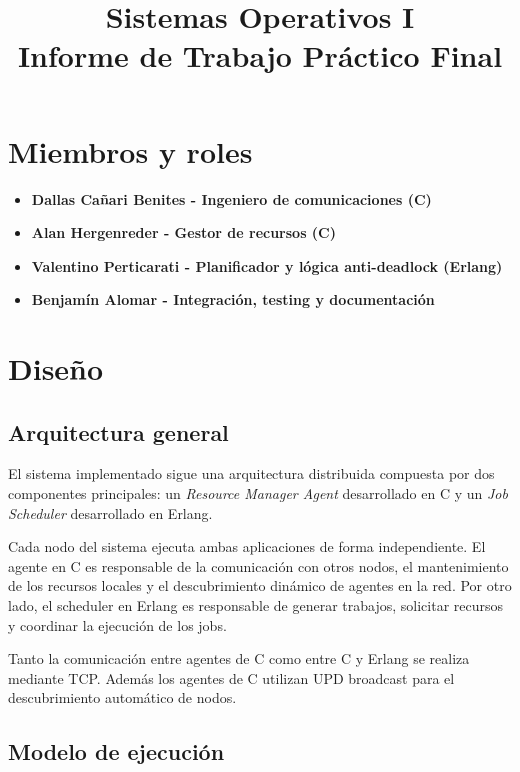 \documentclass[a4paper,10pt]{article}
\title{\textbf{Sistemas Operativos I}\\Informe de Trabajo Práctico Final}
\author{}
\date{}
\begin{document}
\maketitle

\vspace{-1.5cm}
\section{Miembros y roles}

\begin{itemize}
    \item \textbf{Dallas Cañari Benites - Ingeniero de comunicaciones (C)}

    \item \textbf{Alan Hergenreder - Gestor de recursos (C)}

    \item \textbf{Valentino Perticarati - Planificador y lógica anti-deadlock (Erlang)}

    \item \textbf{Benjamín Alomar - Integración, testing y documentación}
\end{itemize}

\section{Diseño}

\subsection{Arquitectura general}

El sistema implementado sigue una arquitectura distribuida compuesta por dos componentes principales: un \textit{Resource Manager Agent} desarrollado en C y un \textit{Job Scheduler} desarrollado en Erlang.

\noindent Cada nodo del sistema ejecuta ambas aplicaciones de forma independiente. El agente en C es responsable de la comunicación con otros nodos, el mantenimiento de los recursos locales y el descubrimiento dinámico de agentes en la red. Por otro lado, el scheduler en Erlang es responsable de generar trabajos, solicitar recursos y coordinar la ejecución de los jobs.

\noindent Tanto la comunicación entre agentes de C como entre C y Erlang se realiza mediante TCP. Además los agentes de C utilizan UPD broadcast para el descubrimiento automático de nodos.

\subsection{Modelo de ejecución}
\end{document}
